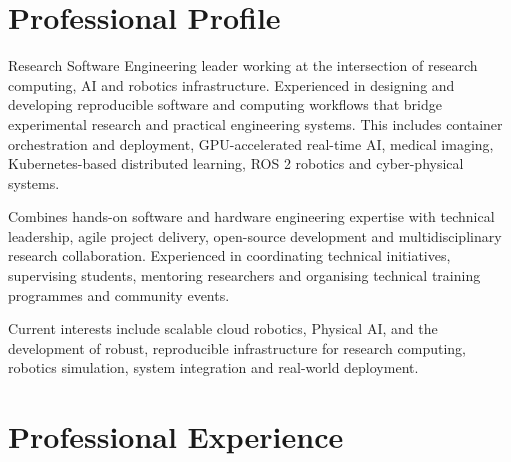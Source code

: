 \documentclass{mycv}
\begin{document}
\maketitle


\section{Professional Profile}

Research Software Engineering leader working at the intersection of research computing, AI and robotics infrastructure. 
Experienced in designing and developing reproducible software and computing workflows that bridge experimental research and practical engineering systems. 
This includes container orchestration and deployment, GPU-accelerated real-time AI, medical imaging, Kubernetes-based distributed learning, ROS 2 robotics and cyber-physical systems.

Combines hands-on software and hardware engineering expertise with technical leadership, agile project delivery, open-source development and multidisciplinary research collaboration. 
Experienced in coordinating technical initiatives, supervising students, mentoring researchers and organising technical training programmes and community events.

Current interests include scalable cloud robotics, Physical AI, and the development of robust, reproducible infrastructure for research computing, robotics simulation, system integration and real-world deployment.


\footnotesize

\section{Professional Experience}
\end{document}
